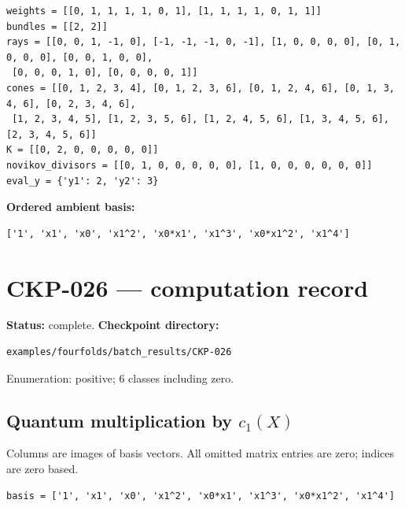 \documentclass[10pt,a4paper]{article}
\begin{document}
\begin{lstlisting}
weights = [[0, 1, 1, 1, 1, 0, 1], [1, 1, 1, 1, 0, 1, 1]]
bundles = [[2, 2]]
rays = [[0, 0, 1, -1, 0], [-1, -1, -1, 0, -1], [1, 0, 0, 0, 0], [0, 1, 0, 0, 0], [0, 0, 1, 0, 0],
 [0, 0, 0, 1, 0], [0, 0, 0, 0, 1]]
cones = [[0, 1, 2, 3, 4], [0, 1, 2, 3, 6], [0, 1, 2, 4, 6], [0, 1, 3, 4, 6], [0, 2, 3, 4, 6],
 [1, 2, 3, 4, 5], [1, 2, 3, 5, 6], [1, 2, 4, 5, 6], [1, 3, 4, 5, 6], [2, 3, 4, 5, 6]]
K = [[0, 2, 0, 0, 0, 0, 0]]
novikov_divisors = [[0, 1, 0, 0, 0, 0, 0], [1, 0, 0, 0, 0, 0, 0]]
eval_y = {'y1': 2, 'y2': 3}
\end{lstlisting}

\textbf{Ordered ambient basis:}
\begin{lstlisting}
['1', 'x1', 'x0', 'x1^2', 'x0*x1', 'x1^3', 'x0*x1^2', 'x1^4']
\end{lstlisting}

\clearpage\section*{CKP-026 --- computation record}
\textbf{Status:} complete.
\textbf{Checkpoint directory:}
\begin{lstlisting}
examples/fourfolds/batch_results/CKP-026
\end{lstlisting}

Enumeration: positive; 6 classes including zero.
\subsection*{Quantum multiplication by $c_1(X)$}
Columns are images of basis vectors. All omitted matrix entries are zero; indices are zero based.

\begin{lstlisting}
basis = ['1', 'x1', 'x0', 'x1^2', 'x0*x1', 'x1^3', 'x0*x1^2', 'x1^4']
\end{lstlisting}
\end{document}

